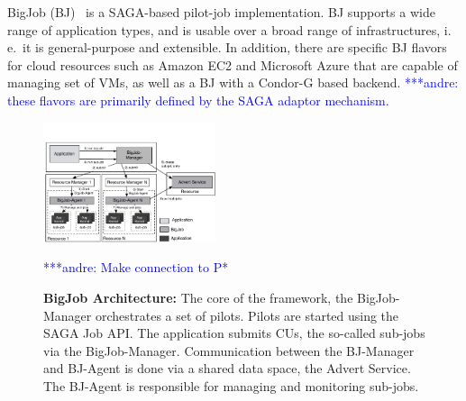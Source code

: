 \documentclass[conference,final]{IEEEtran}
\newcommand{\jhanote}[1]{ {\textcolor{red} { ***shantenu: #1 }}}
\newcommand{\alnote}[1]{ {\textcolor{blue} { ***andre: #1 }}}
\newcommand{\alnote}[1]{}
\newcommand{\jhanote}[1]{}
\newcommand{\upp}{\vspace*{-0.5em}}
\begin{document}







BigJob (BJ)~\cite{bigjob_web,saga_bigjob_condor_cloud} is a SAGA-based pilot-job
implementation. BJ supports a wide range of application types, and is usable
over a broad range of infrastructures, i.\,e.\ it is general-purpose and
extensible. In addition, there are specific BJ flavors for cloud resources such
as Amazon EC2 and Microsoft Azure that are capable of managing set of VMs, as
well as a BJ with a Condor-G based backend. \alnote{these flavors are primarily 
defined by the SAGA adaptor mechanism.}

\begin{figure}[t]
	\upp\upp\upp\upp
	\centering
	\includegraphics[width=0.45\textwidth]{figures/re_bigjob_interactions.pdf}
	\caption{\textbf{BigJob Architecture:} The core of the
          framework, the BigJob-Manager orchestrates a set of
          pilots. Pilots are started using the SAGA Job API. The
          application submits CUs, the so-called sub-jobs via the
          BigJob-Manager. Communication between the BJ-Manager and
          BJ-Agent is done via a shared data space, the Advert
          Service. The BJ-Agent is responsible for managing and
          monitoring sub-jobs.}
		\alnote{Make connection to P*}
	\label{fig:figures_re_bigjob_interactions}
	\upp\upp \upp
\end{figure}
\end{document}
